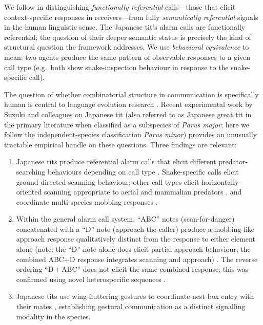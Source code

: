 \documentclass[12pt]{article}
\begin{document}
We follow \citet{seyfarth2003} in distinguishing
\emph{functionally referential} calls---those that elicit
context-specific responses in receivers---from
fully \emph{semantically referential} signals in the human linguistic sense.
The Japanese tit's alarm calls are functionally referential;
the question of their deeper semantic status
is precisely the kind of structural question the framework addresses.
We use \emph{behavioral equivalence} to mean:
two agents produce the same pattern of observable responses
to a given call type (e.g.\ both show snake-inspection behaviour
in response to the snake-specific call).

The question of whether combinatorial structure in communication
is specifically human is central to language evolution research
\citep{hockett1960,hauser2002}.
Recent experimental work by Suzuki and colleagues
on Japanese tit (also referred to as Japanese great tit in the primary
literature when classified as a subspecies of \textit{Parus major};
here we follow the independent-species classification \textit{Parus minor})
provides an unusually tractable empirical handle on these questions.
Three findings are relevant:

\begin{enumerate}
\item Japanese tits produce referential alarm calls
      that elicit different predator-searching behaviours
      depending on call type \citep{suzuki2012}.
      Snake-specific calls elicit ground-directed scanning behaviour;
      other call types elicit horizontally-oriented scanning
      appropriate to aerial and mammalian predators \citep{suzuki2012},
      and coordinate multi-species mobbing responses \citep{suzuki2016mob}.

\item Within the general alarm call system,
      ``ABC'' notes (scan-for-danger) concatenated with a ``D'' note
      (approach-the-caller) produce a mobbing-like approach response
      qualitatively distinct from the response to either element alone
      (note: the ``D'' note alone does elicit partial approach behaviour;
      the combined ABC+D response integrates scanning and approach)
      \citep{suzuki2016syn}.
      The reverse ordering ``D\,+\,ABC'' does not elicit
      the same combined response; this was confirmed using
      novel heterospecific sequences \citep{suzuki2017ord}.

\item Japanese tits use wing-fluttering gestures
      to coordinate nest-box entry with their mates \citep{suzuki2024},
      establishing gestural communication as a distinct signalling modality
      in the species.
\end{enumerate}
\end{document}
